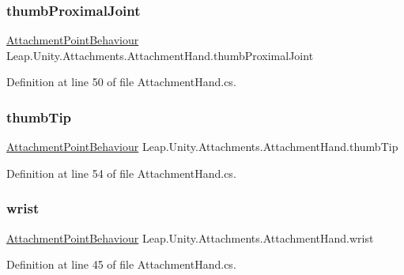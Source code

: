 \subsubsection{\texorpdfstring{thumbProximalJoint}{thumbProximalJoint}}
{\footnotesize\ttfamily \mbox{\hyperlink{class_leap_1_1_unity_1_1_attachments_1_1_attachment_point_behaviour}{Attachment\+Point\+Behaviour}} Leap.\+Unity.\+Attachments.\+Attachment\+Hand.\+thumb\+Proximal\+Joint}



Definition at line 50 of file Attachment\+Hand.\+cs.

\mbox{\label{class_leap_1_1_unity_1_1_attachments_1_1_attachment_hand_af4a0720fe7831d8e91d1237be65e69dc}} 
\subsubsection{\texorpdfstring{thumbTip}{thumbTip}}
{\footnotesize\ttfamily \mbox{\hyperlink{class_leap_1_1_unity_1_1_attachments_1_1_attachment_point_behaviour}{Attachment\+Point\+Behaviour}} Leap.\+Unity.\+Attachments.\+Attachment\+Hand.\+thumb\+Tip}



Definition at line 54 of file Attachment\+Hand.\+cs.

\mbox{\label{class_leap_1_1_unity_1_1_attachments_1_1_attachment_hand_a92a8b41e8e6213733acf1b9c727d2b12}} 
\subsubsection{\texorpdfstring{wrist}{wrist}}
{\footnotesize\ttfamily \mbox{\hyperlink{class_leap_1_1_unity_1_1_attachments_1_1_attachment_point_behaviour}{Attachment\+Point\+Behaviour}} Leap.\+Unity.\+Attachments.\+Attachment\+Hand.\+wrist}



Definition at line 45 of file Attachment\+Hand.\+cs.



